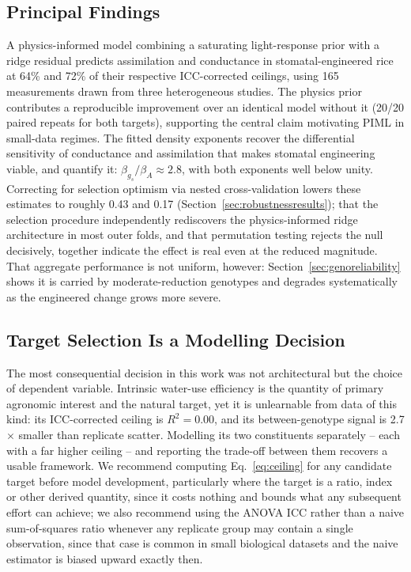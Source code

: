 \documentclass[runningheads]{llncs}
\begin{document}
\subsection{Principal Findings}
A physics-informed model combining a saturating light-response prior with a ridge residual predicts assimilation and conductance in stomatal-engineered rice at 64\% and 72\% of their respective ICC-corrected ceilings, using 165 measurements drawn from three heterogeneous studies. The physics prior contributes a reproducible improvement over an identical model without it (20/20 paired repeats for both targets), supporting the central claim motivating PIML in small-data regimes. The fitted density exponents recover the differential sensitivity of conductance and assimilation that makes stomatal engineering viable, and quantify it: $\beta_{g_s}/\beta_A \approx 2.8$, with both exponents well below unity. Correcting for selection optimism via nested cross-validation lowers these estimates to roughly 0.43 and 0.17 (Section~\ref{sec:robustnessresults}); that the selection procedure independently rediscovers the physics-informed ridge architecture in most outer folds, and that permutation testing rejects the null decisively, together indicate the effect is real even at the reduced magnitude. That aggregate performance is not uniform, however: Section~\ref{sec:genoreliability} shows it is carried by moderate-reduction genotypes and degrades systematically as the engineered change grows more severe.

\subsection{Target Selection Is a Modelling Decision}
The most consequential decision in this work was not architectural but the choice of dependent variable. Intrinsic water-use efficiency is the quantity of primary agronomic interest and the natural target, yet it is unlearnable from data of this kind: its ICC-corrected ceiling is $R^{2}=0.00$, and its between-genotype signal is 2.7$\times$ smaller than replicate scatter. Modelling its two constituents separately -- each with a far higher ceiling -- and reporting the trade-off between them recovers a usable framework. We recommend computing Eq.~\ref{eq:ceiling} for any candidate target before model development, particularly where the target is a ratio, index or other derived quantity, since it costs nothing and bounds what any subsequent effort can achieve; we also recommend using the ANOVA ICC rather than a naive sum-of-squares ratio whenever any replicate group may contain a single observation, since that case is common in small biological datasets and the naive estimator is biased upward exactly then.
\end{document}
